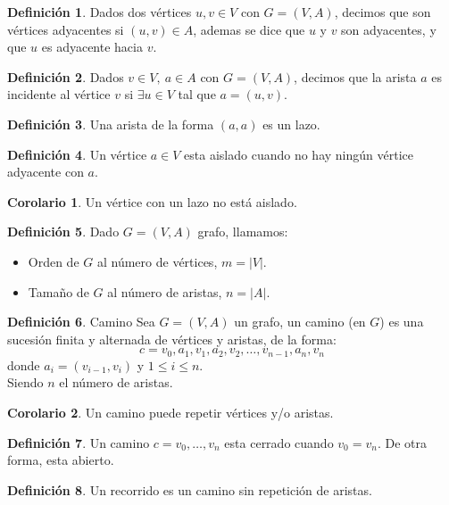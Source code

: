 \documentclass[10pt]{article}
\theoremstyle{definition}
\newtheorem{definition}{Definición}[section]
\newtheorem{corollary}{Corolario}[theorem]
\begin{document}
    \begin{definition}
        Dados dos vértices $u,v\in V$ con $G=(V,A)$, decimos que son vértices adyacentes si $(u,v)\in A$, ademas se dice que $u$ y $v$ son adyacentes, y que $u$ es adyacente hacia $v$.
    \end{definition}
    \begin{definition}
        Dados $v\in V,\ a\in A$ con $G=(V,A)$, decimos que la arista $a$ es incidente al vértice $v$ si $\exists u\in V$ tal que $a=(u,v)$.
    \end{definition}
    \begin{definition}
        Una arista de la forma $(a,a)$ es un lazo.
    \end{definition}
    \begin{definition}
        Un vértice $a\in V$ esta aislado cuando no hay ningún vértice adyacente con $a$.
    \end{definition}
    \begin{corollary}
        Un vértice con un lazo no está aislado.
    \end{corollary}
    \begin{definition}
        Dado $G=(V,A)$ grafo, llamamos:
        \begin{itemize}
            \item Orden de $G$ al número de vértices, $m=|V|$.
            \item Tamaño de $G$ al número de aristas, $n=|A|$.
        \end{itemize}
    \end{definition}
    \begin{definition}{Camino}
        Sea $G=(V,A)$ un grafo, un camino (en $G$) es una sucesión finita y alternada de vértices y aristas, de la forma: $$c=v_0,a_1,v_1,a_2,v_2,\dots,v_{n-1},a_n,v_n$$donde $a_i=(v_{i-1},v_i)$ y $1\le i\le n$.\\Siendo $n$ el número de aristas.
    \end{definition}
    \begin{corollary}
        Un camino puede repetir vértices y/o aristas.
    \end{corollary}
    \begin{definition}
        Un camino $c=v_0,\dots,v_n$ esta cerrado cuando $v_0=v_n$. De otra forma, esta abierto.
    \end{definition}
    \begin{definition}
        Un recorrido es un camino sin repetición de aristas.
    \end{definition}
\end{document}
